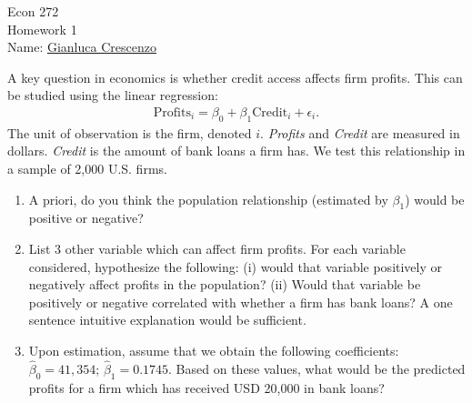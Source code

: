\documentclass[11pt,twoside,openany]{memoir}
\begin{document}
\begin{center}
{\large Econ 272 \\[0.1in]Homework 1 \\[0.1in]}
{Name:} {\underline{Gianluca Crescenzo\hspace*{2in}}}\\[0.15in]
\end{center}
\vspace{4pt}
    \begin{question}
        A key question in economics is whether credit access affects firm profits. This can be studied using the linear regression:
            \begin{equation*}
            \begin{split}
                \text{Profits}_i = \beta_0 + \beta_1 \text{Credit}_i + \epsilon_i.
            \end{split}
            \end{equation*}
        The unit of observation is the firm, denoted $i$. \textit{Profits} and \textit{Credit} are measured in dollars. \textit{Credit} is the amount of bank loans a firm has. We test this relationship in a sample of 2,000 U.S. firms.
        \begin{enumerate}[label = (\alph*),itemsep=1pt,topsep=3pt]
            \item A priori, do you think the population relationship (estimated by $\beta_1$) would be positive or negative?
            \item List 3 other variable which can affect firm profits. For each variable considered, hypothesize the following: (i) would that variable positively or negatively affect profits in the population? (ii) Would that variable be positively or negative correlated with whether a firm has bank loans? A one sentence intuitive explanation would be sufficient.
            \item Upon estimation, assume that we obtain the following coefficients: $\hat{\beta}_0 = 41,354$; $\hat{\beta}_1 = 0.1745$. Based on these values, what would be the predicted profits for a firm which has received USD 20,000 in bank loans?
        \end{enumerate}
    \end{question}
\end{document}

